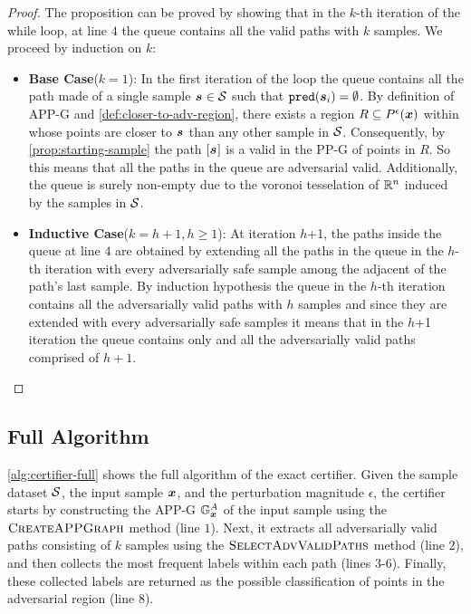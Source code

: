\begin{proof}
The proposition can be proved by showing that in the $k$-th iteration of the while loop, at line $4$ the queue contains all the valid paths with $k$ samples.
We proceed by induction on $k$:
\begin{itemize}
  \item \textbf{Base Case}($k = 1$): In the first iteration of the loop the queue contains all the path made of a single sample $\sample[] \in \set$ such that $\pred{\sample} = \emptyset$.  By definition of \acs{APP-G} and \autoref{def:closer-to-adv-region}, there exists a region $R \subseteq \pert$ within whose points are closer to $\sample[]$ than any other sample in $\set$. Consequently, by \autoref{prop:starting-sample} the path $[\sample[]]$ is a valid in the \acs{PP-G} of points in $R$. So this means that all the paths in the queue are adversarial valid. Additionally, the queue is surely non-empty due to the voronoi tesselation \cite{voronoi-tessellation} of $\R$ induced by the samples in $\set$.
  \item \textbf{Inductive Case}($k = h+1, h \ge 1$): At iteration $h$+1, the paths inside the queue at line $4$ are obtained by extending all the paths in the queue in the $h$-th iteration with every adversarially safe sample among the adjacent of the path's last sample. By induction hypothesis the queue in the $h$-th iteration contains all the adversarially valid paths with $h$ samples and since they are extended with every adversarially safe samples it means that in the $h$+1 iteration the queue contains only and all the adversarially valid paths comprised of $h+1$.
\end{itemize}
\end{proof}

\subsection{Full Algorithm}
\label{subsec:full-algorithm}


\autoref{alg:certifier-full} shows the full algorithm of the exact certifier. Given the sample dataset $\set$, the input sample $\vinput$, and the perturbation magnitude $\epsilon$, the certifier starts by constructing the \acs{APP-G} $\APPG$ of the input sample using the $\algtitle{CreateAPPGraph}$ method (line $1$). Next, it extracts all adversarially valid paths consisting  of $k$ samples using the $\algtitle{SelectAdvValidPaths}$ method (line $2$), and then collects the most frequent labels within each path (lines $3$-$6$). Finally, these collected labels are returned as the possible classification of points in the adversarial region (line $8$).

